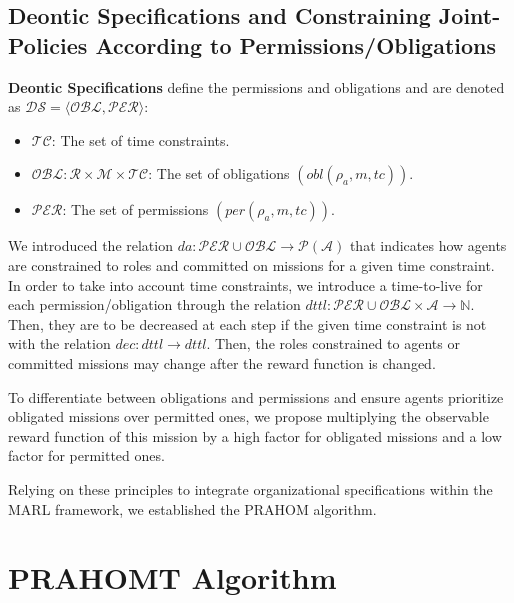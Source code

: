 \documentclass[runningheads]{llncs}
\theoremstyle{freethm}
\theoremstyle{proofoutline}
\newcounter{relation}
\begin{document}
\subsection{Deontic Specifications and Constraining Joint-Policies According to Permissions/Obligations}

\textbf{Deontic Specifications} define the permissions and obligations and are denoted as $\mathcal{DS} = \langle \mathcal{OBL}, \mathcal{PER} \rangle$:

\begin{itemize}
    \item $\mathcal{TC}$: The set of time constraints.
    \item $\mathcal{OBL}: \mathcal{R} \times \mathcal{M} \times \mathcal{TC}$: The set of obligations $(obl(\rho_a, m, tc))$.
    \item $\mathcal{PER}$: The set of permissions $(per(\rho_a, m, tc))$.
\end{itemize}

We introduced the relation $da: \mathcal{PER} \cup \mathcal{OBL} \rightarrow \mathcal{P}(\mathcal{A})$ that indicates how agents are constrained to roles and committed on missions for a given time constraint. In order to take into account time constraints, we introduce a time-to-live for each permission/obligation through the relation $dttl: \mathcal{PER} \cup \mathcal{OBL} \times \mathcal{A} \rightarrow \mathbb{N}$. Then, they are to be decreased at each step if the given time constraint is not  with the relation $dec: dttl \rightarrow dttl$. Then, the roles constrained to agents or committed missions may change after the reward function is changed.

To differentiate between obligations and permissions and ensure agents prioritize obligated missions over permitted ones, we propose multiplying the observable reward function of this mission by a high factor for obligated missions and a low factor for permitted ones.

Relying on these principles to integrate organizational specifications within the MARL framework, we established the PRAHOM algorithm.


\section{PRAHOMT Algorithm}\label{sec:prahom_alg}

\end{document}
